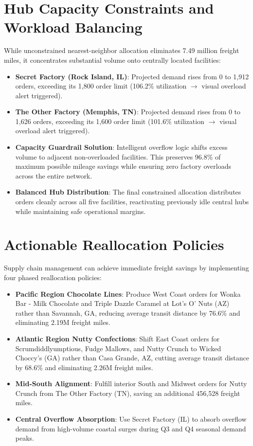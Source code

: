 \documentclass[12pt]{article}
\begin{document}
\vspace{10pt}

\section{Hub Capacity Constraints and Workload Balancing}
While unconstrained nearest-neighbor allocation eliminates 7.49 million freight miles, it concentrates substantial volume onto centrally located facilities:
\begin{itemize}
    \item \textbf{Secret Factory (Rock Island, IL)}: Projected demand rises from 0 to 1,912 orders, exceeding its 1,800 order limit (106.2\% utilization $\rightarrow$ visual overload alert triggered).
    \item \textbf{The Other Factory (Memphis, TN)}: Projected demand rises from 0 to 1,626 orders, exceeding its 1,600 order limit (101.6\% utilization $\rightarrow$ visual overload alert triggered).
    \item \textbf{Capacity Guardrail Solution}: Intelligent overflow logic shifts excess volume to adjacent non-overloaded facilities. This preserves 96.8\% of maximum possible mileage savings while ensuring zero factory overloads across the entire network.
    \item \textbf{Balanced Hub Distribution}: The final constrained allocation distributes orders cleanly across all five facilities, reactivating previously idle central hubs while maintaining safe operational margins.
\end{itemize}

\newpage
\section{Actionable Reallocation Policies}
Supply chain management can achieve immediate freight savings by implementing four phased reallocation policies:
\begin{itemize}
    \item \textbf{Pacific Region Chocolate Lines}: Produce West Coast orders for Wonka Bar - Milk Chocolate and Triple Dazzle Caramel at Lot's O' Nuts (AZ) rather than Savannah, GA, reducing average transit distance by 76.6\% and eliminating 2.19M freight miles.
    \item \textbf{Atlantic Region Nutty Confections}: Shift East Coast orders for Scrumdiddlyumptious, Fudge Mallows, and Nutty Crunch to Wicked Choccy's (GA) rather than Casa Grande, AZ, cutting average transit distance by 68.6\% and eliminating 2.26M freight miles.
    \item \textbf{Mid-South Alignment}: Fulfill interior South and Midwest orders for Nutty Crunch from The Other Factory (TN), saving an additional 456,528 freight miles.
    \item \textbf{Central Overflow Absorption}: Use Secret Factory (IL) to absorb overflow demand from high-volume coastal surges during Q3 and Q4 seasonal demand peaks.
\end{itemize}
\end{document}
